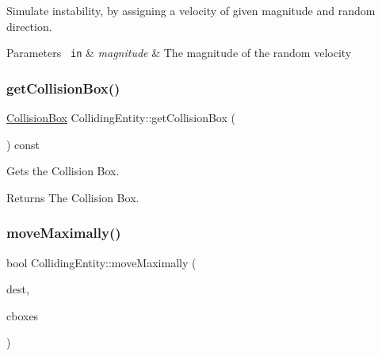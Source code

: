 Simulate instability, by assigning a velocity of given magnitude and random direction. 


\begin{DoxyParams}[1]{Parameters}
\mbox{\texttt{ in}}  & {\em magnitude} & The magnitude of the random velocity \\
\hline
\end{DoxyParams}
\mbox{\label{class_colliding_entity_ac47d631afb3401467c99b87ee42d895a}} 
\subsubsection{\texorpdfstring{getCollisionBox()}{getCollisionBox()}}
{\footnotesize\ttfamily \mbox{\hyperlink{class_collision_box}{Collision\+Box}} Colliding\+Entity\+::get\+Collision\+Box (\begin{DoxyParamCaption}{ }\end{DoxyParamCaption}) const\hspace{0.3cm}{\ttfamily [inline]}}



Gets the Collision Box. 

\begin{DoxyReturn}{Returns}
The Collision Box. 
\end{DoxyReturn}
\mbox{\label{class_colliding_entity_ac0d229da4e16008922ad0c018002e747}} 
\subsubsection{\texorpdfstring{moveMaximally()}{moveMaximally()}}
{\footnotesize\ttfamily bool Colliding\+Entity\+::move\+Maximally (\begin{DoxyParamCaption}\item[{\mbox{\hyperlink{classsf_1_1_vector2}{sf\+::\+Vector2f}}}]{dest,  }\item[{const std\+::vector$<$ \mbox{\hyperlink{class_collision_box}{Collision\+Box}} $>$ \&}]{cboxes }\end{DoxyParamCaption})\hspace{0.3cm}{\ttfamily [inline]}}



